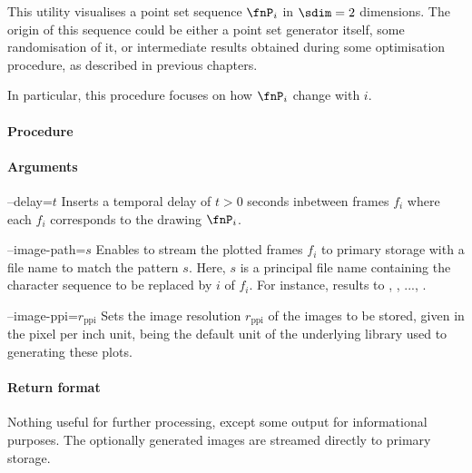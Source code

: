 %
This utility visualises a point set sequence $\fnP_i$ in $\sdim=2$ dimensions. The origin of this sequence could be either a point set generator itself, some randomisation of it, or intermediate results obtained during some optimisation procedure, as described in previous chapters.

In particular, this procedure focuses on how $\fnP_i$ change with $i$.

\paragraph{Procedure}

\begin{synopsis}
\end{synopsis}

\paragraph{Arguments}

\procarginseq{\ptseqsize}

\begin{procarg}{--delay=$t$}
  Inserts a temporal delay of $t > 0$ seconds inbetween frames $f_i$ where each $f_i$ corresponds to the drawing $\fnP_i$.
\end{procarg}

\begin{procarg}{--image-path=$s$}
  Enables to stream the plotted frames $f_i$ to primary storage with a file name to match the pattern $s$. Here, $s$ is a principal file name containing the character sequence  to be replaced by $i$ of $f_i$. For instance,  results to , , ..., .
\end{procarg}

\begin{procarg}{--image-ppi=$r_{\text{ppi}}$}
  Sets the image resolution $r_{\text{ppi}}$ of the images to be stored, given in the pixel per inch unit, being the default unit of the underlying library used to generating these plots.
\end{procarg}

\procargsilent


\paragraph{Return format}

Nothing useful for further processing, except some output for informational purposes. The optionally generated images are streamed directly to primary storage.
